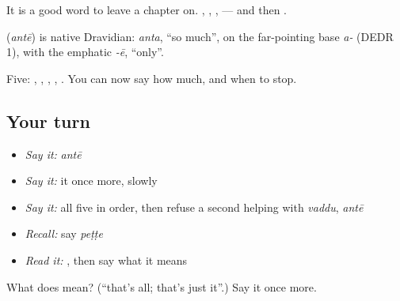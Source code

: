 It is a good word to leave a chapter on. , , ,  — and then .

\begin{cousinweb}
\textbf{} (\emph{antē}) is native Dravidian: \emph{anta}, \textquotedblleft{}so much\textquotedblright{}, on the far-pointing base \emph{a-} (DEDR 1), with the emphatic \emph{-ē}, \textquotedblleft{}only\textquotedblright{}.
\end{cousinweb}

\begin{grammarlens}[title={What you've built}]
Five: , , , , . You can now say how much, and when to stop.
\end{grammarlens}

\subsection*{Your turn}
\begin{itemize}
\raggedright
  \item \emph{Say it:} \emph{antē}
  \item \emph{Say it:} it once more, slowly
  \item \emph{Say it:} all five in order, then refuse a second helping with \emph{vaddu}, \emph{antē}
  \item \emph{Recall:} say \emph{peṭṭe}
  \item \emph{Read it:} \textbf{}, then say what it means
\end{itemize}

\begin{tcolorbox}[breakable,colback=teal!4,colframe=teal!35!black,title={Before you move on}]
What does  mean? (\textquotedblleft{}that's all; that's just it\textquotedblright{}.) Say it once more.
\end{tcolorbox}
